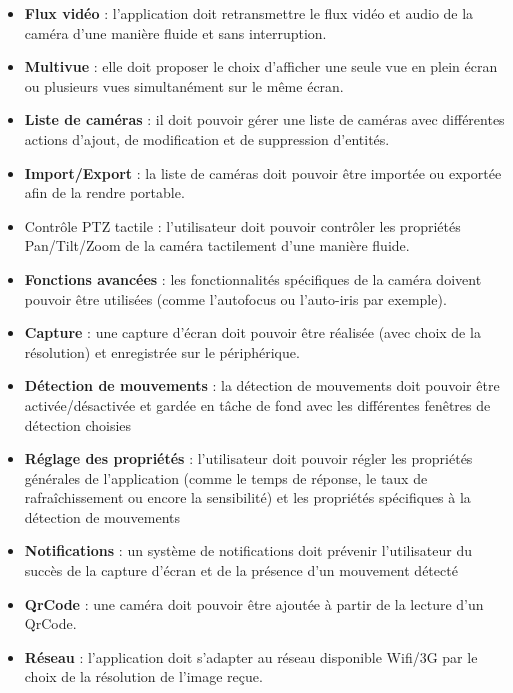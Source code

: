 \begin{itemize}
  \item \textbf{Flux vidéo} : l'application doit retransmettre le flux vidéo et
  audio de la caméra d'une manière fluide et sans interruption.
  \item \textbf{Multivue} : elle doit proposer le choix d'afficher une seule vue en
  plein écran ou plusieurs vues simultanément sur le même écran.
  \item \textbf{Liste de caméras} : il doit pouvoir gérer une liste de caméras avec
  différentes actions d'ajout, de modification et de suppression d'entités.
  \item \textbf{Import/Export} : la liste de caméras doit pouvoir être importée ou
  exportée afin de la rendre portable.
  \item {Contrôle PTZ tactile} : l'utilisateur doit pouvoir contrôler les
  propriétés Pan/Tilt/Zoom de la caméra tactilement d'une manière fluide.
  \item \textbf{Fonctions avancées} : les fonctionnalités spécifiques de la caméra
  doivent pouvoir être utilisées (comme l'autofocus ou l'auto-iris par exemple).
  \item \textbf{Capture} : une capture d'écran doit pouvoir être réalisée (avec
  choix de la résolution) et enregistrée sur le périphérique.
  \item \textbf{Détection de mouvements} : la détection de mouvements doit pouvoir
  être activée/désactivée et gardée en tâche de fond avec les différentes fenêtres de détection choisies
  \item \textbf{Réglage des propriétés} : l'utilisateur doit pouvoir régler les
  propriétés générales de l'application (comme le temps de réponse, le taux de rafraîchissement ou encore la sensibilité) et les propriétés spécifiques à la détection de mouvements
  \item \textbf{Notifications} : un système de notifications doit prévenir
  l'utilisateur du succès de la capture d'écran et de la présence d'un mouvement détecté
  \item \textbf{QrCode} : une caméra doit pouvoir être ajoutée à partir de la
  lecture d'un QrCode.
  \item \textbf{Réseau} : l'application doit s'adapter au réseau disponible Wifi/3G
  par le choix de la résolution de l'image reçue.
\end{itemize}

